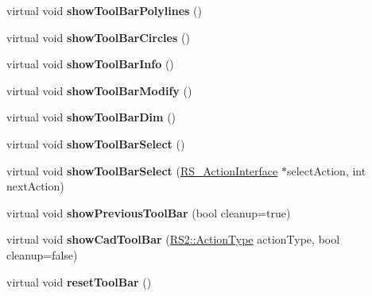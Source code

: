 \begin{DoxyCompactItemize}
\item 
\hypertarget{classQG__CadToolBar_aa2b2ec10acadaf351de60a4a6fbd4879}{virtual void {\bfseries show\-Tool\-Bar\-Polylines} ()}\label{classQG__CadToolBar_aa2b2ec10acadaf351de60a4a6fbd4879}

\item 
\hypertarget{classQG__CadToolBar_a987d129b4169eccc56e09c16adb10331}{virtual void {\bfseries show\-Tool\-Bar\-Circles} ()}\label{classQG__CadToolBar_a987d129b4169eccc56e09c16adb10331}

\item 
\hypertarget{classQG__CadToolBar_a3e618eff881072592cb0da90a3d4c019}{virtual void {\bfseries show\-Tool\-Bar\-Info} ()}\label{classQG__CadToolBar_a3e618eff881072592cb0da90a3d4c019}

\item 
\hypertarget{classQG__CadToolBar_aa3a0cfe9bb1595433f048b2cb496beaa}{virtual void {\bfseries show\-Tool\-Bar\-Modify} ()}\label{classQG__CadToolBar_aa3a0cfe9bb1595433f048b2cb496beaa}

\item 
\hypertarget{classQG__CadToolBar_a148ab49017fc493d1840ef9b987678d6}{virtual void {\bfseries show\-Tool\-Bar\-Dim} ()}\label{classQG__CadToolBar_a148ab49017fc493d1840ef9b987678d6}

\item 
\hypertarget{classQG__CadToolBar_aa527689bdad5446ad91db5a884fd1300}{virtual void {\bfseries show\-Tool\-Bar\-Select} ()}\label{classQG__CadToolBar_aa527689bdad5446ad91db5a884fd1300}

\item 
\hypertarget{classQG__CadToolBar_ac3b634e6ca1330a821f436e494c7514d}{virtual void {\bfseries show\-Tool\-Bar\-Select} (\hyperlink{classRS__ActionInterface}{R\-S\-\_\-\-Action\-Interface} $\ast$select\-Action, int next\-Action)}\label{classQG__CadToolBar_ac3b634e6ca1330a821f436e494c7514d}

\item 
\hypertarget{classQG__CadToolBar_a160e25a3dcdf0ce47251772745d2aa4e}{virtual void {\bfseries show\-Previous\-Tool\-Bar} (bool cleanup=true)}\label{classQG__CadToolBar_a160e25a3dcdf0ce47251772745d2aa4e}

\item 
\hypertarget{classQG__CadToolBar_abed472cedcfe5809751b2846ff57f16e}{virtual void {\bfseries show\-Cad\-Tool\-Bar} (\hyperlink{classRS2_afe3523e0bc41fd637b892321cfc4b9d7}{R\-S2\-::\-Action\-Type} action\-Type, bool cleanup=false)}\label{classQG__CadToolBar_abed472cedcfe5809751b2846ff57f16e}

\item 
\hypertarget{classQG__CadToolBar_ac70b7fa2df5b9e25c2ec97d317ea2306}{virtual void {\bfseries reset\-Tool\-Bar} ()}\label{classQG__CadToolBar_ac70b7fa2df5b9e25c2ec97d317ea2306}

\end{DoxyCompactItemize}
